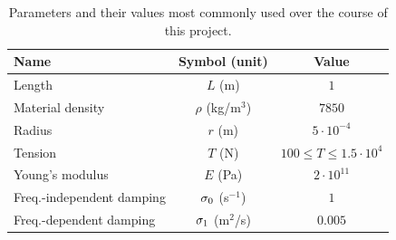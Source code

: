 \begin{table}[h]
    \begin{center}
    \begin{tabular}{|l|c|c|}
        \hline
        Name & Symbol (unit) & Value\\ \hline
        Length & $L$ (m) & $1$\\
        Material density & $\rho$ (kg/m$^3$) & $7850$\\
        Radius & $r$ (m) & $5\cdot10^{-4}$\\
        Tension & $T$ (N) &$100 \leq T \leq 1.5\cdot 10^4$\\
        Young's modulus & $E$ (Pa) & $2\cdot10^{11}$\\
        Freq.-independent damping & $\sigma_{0}$ (s$^{-1}$) & $1$\\
        Freq.-dependent damping & $\sigma_{1}$ (m$^2$/s) & $0.005$\\\hline
    \end{tabular}
    \caption{Parameters and their values most commonly used over the course of this project.\label{tab:stiffStringParams}}
    \end{center}
\end{table}
